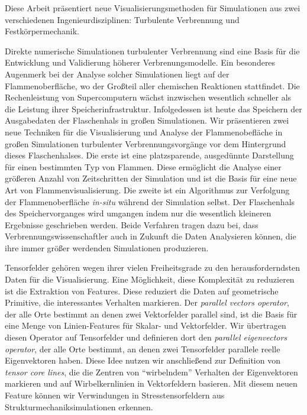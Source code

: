 \documentclass[oneside]{scrartcl}
\author{Timo Oster}
\date{26. April 2019}
\begin{document}
%
Diese Arbeit pr\"asentiert neue Visualisierungsmethoden f\"ur Simulationen aus
zwei verschiedenen Ingenieurdisziplinen: Turbulente Verbrennung und
Festk\"orpermechanik.
%

%
Direkte numerische Simulationen turbulenter Verbrennung sind eine Basis f\"ur
die Entwicklung und Validierung h\"oherer Verbrenungsmodelle.
%
Ein besonderes Augenmerk bei der Analyse solcher Simulationen liegt auf der
Flammenoberfl\"ache, wo der Gro\ss{}teil aller chemischen Reaktionen
stattfindet.
%
Die Rechenleistung von Supercomputern w\"achst inzwischen wesentlich schneller
als die Leistung ihrer Speicherinfrastruktur.
%
Infolgedessen ist heute das Speichern der Ausgabedaten der Flaschenhals in
gro\ss{}en Simulationen.
%
Wir pr\"asentieren zwei neue Techniken f\"ur die Visualisierung und Analyse der
Flammenobefl\"ache in gro\ss{}en Simulationen turbulenter Verbrennungsvorg\"ange
vor dem Hintergrund dieses Flaschenhalses.
%
Die erste ist eine platzsparende, ausged\"unnte Darstellung f\"ur einen
bestimmten Typ von Flammen.
%
Diese erm\"oglicht die Analyse einer gr\"o\ss{}eren Anzahl von Zeitschritten der
Simulation und ist die Basis f\"ur eine neue Art von Flammenvisualisierung.
%
Die zweite ist ein Algorithmus zur Verfolgung der Flammenoberfl\"ache
\emph{in-situ} w\"ahrend der Simulation selbst.
%
Der Flaschenhals des Speichervorganges wird umgangen indem nur die wesentlich
kleineren Ergebnisse geschrieben werden.
%
Beide Verfahren tragen dazu bei, dass Verbrennungswissenschaftler auch in
Zukunft die Daten Analysieren k\"onnen, die ihre immer gr\"o\ss{}er werdenden
Simulationen produzieren.
%

%
Tensorfelder geh\"oren wegen ihrer vielen Freiheitsgrade zu den
herausforderndsten Daten f\"ur die Visualisierung.
%
Eine M\"oglichkeit, diese Komplexit\"at zu reduzieren ist die Extraktion von
Features.
%
Diese reduziert die Daten auf geometrische Primitive, die interessantes
Verhalten markieren.
%
Der \emph{parallel vectors operator}, der alle Orte bestimmt an denen zwei
Vektorfelder parallel sind, ist die Basis f\"ur eine Menge von Linien-Features
f\"ur Skalar- und Vektorfelder.
%
Wir übertragen diesen Operator auf Tensorfelder und definieren dort den
\emph{parallel eigenvectors operator}, der alle Orte bestimmt, an denen zwei
Tensorfelder parallele reelle Eigenvektoren haben.
%
Diese Idee nutzen wir anschlie\ss{}end zur Definition von \emph{tensor core
lines}, die die Zentren von ``wirbelndem'' Verhalten der Eigenvektoren markieren
und auf Wirbelkernlinien in Vektorfeldern basieren.
%
Mit diesem neuen Feature k\"onnen wir Verwindungen in Stresstensorfeldern aus
Strukturmechaniksimulationen erkennen.
\end{document}
